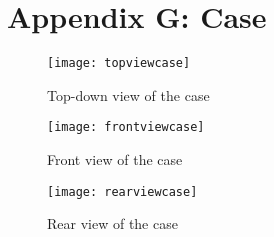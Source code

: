 \newpage

\section*{Appendix G: Case} \label{AppendixG}
\begin{figure}[ht]
    \texttt{[image: topviewcase]}
    \caption{Top-down view of the case}
    \label{fig:topview}
\end{figure}

\begin{figure}[ht]
    \texttt{[image: frontviewcase]}
    \caption{Front view of the case}
    \label{fig:frontview}
\end{figure}

\begin{figure}[ht]
    \texttt{[image: rearviewcase]}
    \caption{Rear view of the case}
    \label{fig:rearview}
\end{figure}

\newpage

